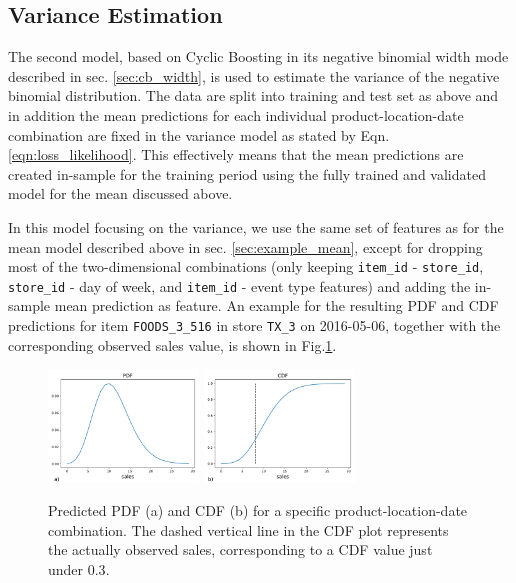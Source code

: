 \documentclass[BCOR=1mm, DIV=calc,10pt,
twoside=true,
twocolumn,
headings=normal]{scrartcl}
\newcommand{\fig}{Fig.}
\newcommand{\eqn}{Eqn.}
\begin{document}
\subsection{Variance Estimation}

The second model, based on Cyclic Boosting in its negative binomial width mode described in sec. \ref{sec:cb_width}, is used to estimate the variance of the negative binomial distribution. The data are split into training and test set as above and in addition the mean predictions for each individual product-location-date combination are fixed in the variance model as stated by \eqn \eqref{eqn:loss_likelihood}. This effectively means that the mean predictions are created in-sample for the training period using the fully trained and validated model for the mean discussed above.

\noindent
In this model focusing on the variance, we use the same set of features as for the mean model described above in sec. \ref{sec:example_mean}, except for dropping most of the two-dimensional combinations (only keeping \texttt{item\_id} - \texttt{store\_id}, \texttt{store\_id} - day of week, and \texttt{item\_id} - event type features) and adding the in-sample mean prediction as feature. An example for the resulting PDF and CDF predictions for item \texttt{FOODS\_3\_516} in store \texttt{TX\_3} on 2016-05-06, together with the corresponding observed sales value, is shown in \fig \ref{fig:pdf_example}.

\begin{figure}
\begin{center}
\includegraphics[width=4cm]{../figures/pdf}
\includegraphics[width=4cm]{../figures/cdf}
\caption{\label{fig:pdf_example} Predicted PDF (a) and CDF (b) for a specific product-location-date combination. The dashed vertical line in the CDF plot represents the actually observed sales, corresponding to a CDF value just under $0.3$.}
\end{center}
\end{figure}
\end{document}
